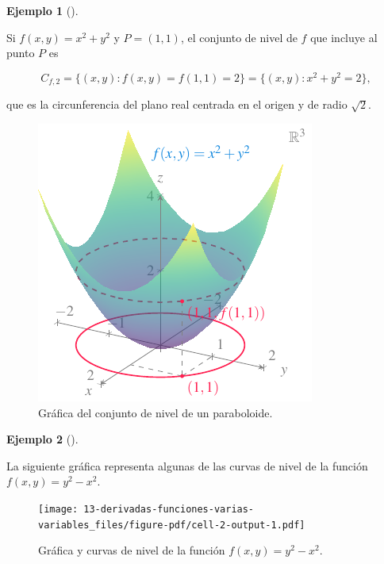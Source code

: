 \documentclass[
  a4paper,
]{scrreport}
\theoremstyle{plain}
\theoremstyle{plain}
\theoremstyle{definition}
\theoremstyle{definition}
\newtheorem{example}{Ejemplo}[chapter]
\theoremstyle{plain}
\theoremstyle{definition}
\theoremstyle{remark}
\begin{document}
\begin{example}[]\protect\hypertarget{exm-conjunto-nivel}{}\label{exm-conjunto-nivel}

Si \(f(x,y)=x^2+y^2\) y \(P=(1,1)\), el conjunto de nivel de \(f\) que
incluye al punto \(P\) es

\[
C_{f,2} = \{(x,y): f(x,y)=f(1,1)=2\} = \{(x,y): x^2+y^2=2\},
\]

que es la circunferencia del plano real centrada en el origen y de radio
\(\sqrt{2}\).

\begin{figure}

{\centering \includegraphics{img/derivadas-funciones-varias-variables/curva-nivel.pdf}

}

\caption{Gráfica del conjunto de nivel de un paraboloide.}

\end{figure}

\end{example}

\begin{example}[]\protect\hypertarget{exm-curvas-nivel}{}\label{exm-curvas-nivel}

La siguiente gráfica representa algunas de las curvas de nivel de la
función \(f(x,y) = y^2-x^2\).

\begin{figure}

{\centering \texttt{[image: 13-derivadas-funciones-varias-variables\_files/figure-pdf/cell-2-output-1.pdf]}

}

\caption{Gráfica y curvas de nivel de la función \(f(x,y)=y^2-x^2\).}

\end{figure}

\end{example}
\end{document}
